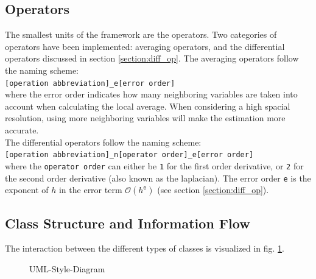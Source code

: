 \subsection{Operators}
The smallest units of the framework are the operators.
Two categories of operators have been implemented: averaging operators, and the differential operators discussed in section \ref{section:diff_op}.
The averaging operators follow the naming scheme:
\\
\texttt{[operation abbreviation]\_e[error order]}
\\
where the error order indicates how many neighboring variables are taken into account when calculating the local average.
When considering a high spacial resolution, using more neighboring variables will make the estimation more accurate.
\\
The differential operators follow the naming scheme:
\\
\texttt{[operation abbreviation]\_n[operator order]\_e[error order]}
\\ 
where the \texttt{operator order} can either be \texttt{1} for the first order derivative, or \texttt{2} for the second order derivative (also known as the laplacian).
The error order \texttt{e} is the exponent of $h$ in the error term $\mathcal{O}(h^\texttt{e})$ (see section \ref{section:diff_op}).

\subsection{Class Structure and Information Flow}
The interaction between the different types of classes is visualized in fig. \ref{UML_diagram}.

\begin{figure}[!h]
    \caption{UML-Style-Diagram}
    \label{UML_diagram}
\end{figure}

